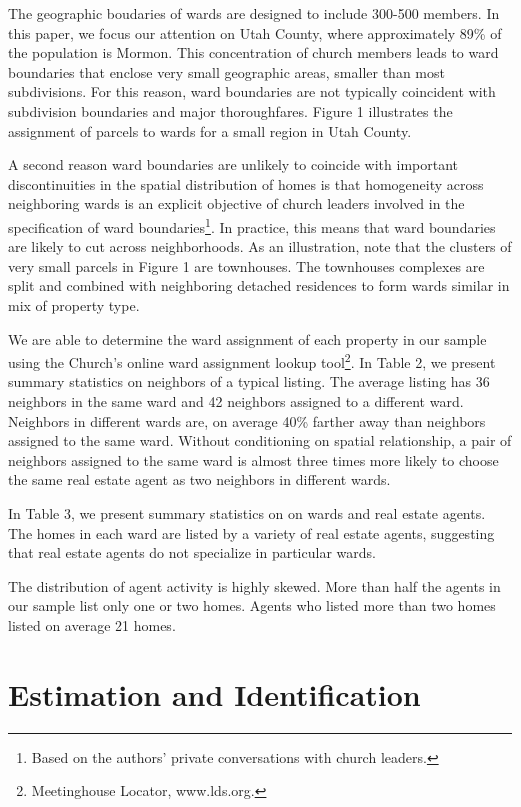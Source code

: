 \documentclass[12pt]{article}
\begin{document}
    The geographic boudaries of wards are designed to include 300-500 members. In this paper, we focus our attention on Utah County, where
    approximately
    89\% of the population is Mormon. This concentration of church members leads to ward boundaries that enclose very small geographic areas, smaller
    than most subdivisions.  For this reason, ward boundaries are not typically coincident with subdivision boundaries and major thoroughfares.
    Figure 1 illustrates the assignment of parcels to wards for a small region in Utah County.

    A second reason ward boundaries are unlikely to coincide with important discontinuities in the spatial distribution of homes
    is that homogeneity across neighboring wards is an explicit objective of church leaders involved in the specification of ward
    boundaries\footnote{Based on the authors' private conversations with church leaders.}.  In practice, this means that ward boundaries are likely to
    cut across neighborhoods.  As an illustration, note that the clusters of very small parcels in Figure 1
    are townhouses.  The townhouses complexes are split and combined with neighboring detached residences to form wards similar in mix of property type.

    We are able to determine the ward assignment of each property in our sample
    using the Church's online ward assignment lookup tool\footnote{Meetinghouse Locator, www.lds.org.}. In Table 2, we present summary statistics on neighbors of a typical listing.  The average listing has 36 neighbors in the same ward and 42
    neighbors assigned to a different ward.  Neighbors in different wards are, on average 40\% farther away than neighbors assigned to the same ward.
    Without conditioning on spatial relationship, a pair of neighbors assigned to the same ward is almost three times more likely to choose the same real estate agent as two neighbors in different
    wards.

    In Table 3, we present summary statistics on on wards and real estate agents. The homes in each ward are listed by a variety of real estate agents, suggesting that real estate agents do not specialize in particular wards.

    The distribution of agent activity is highly skewed.  More than half the agents in our
    sample list only one or two homes.  Agents who listed more than two homes listed on average 21 homes.

\section{Estimation and Identification}
\end{document}

